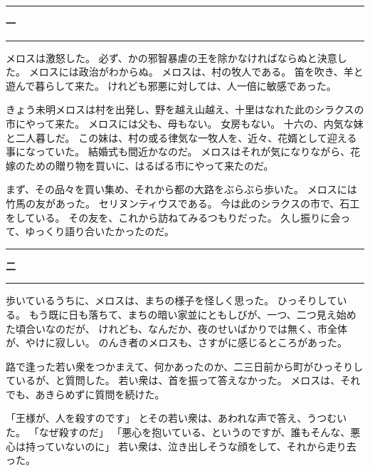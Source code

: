 \documentclass[
  paper       = a5,          %
  fontsize    = 10.5pt,      %
  jafontsize  = 10.5pt,
  baselineskip= 20pt,        %
  line_length = 38zw,        %
  number_of_lines = 17,      %
  head_space  = 20mm,        %
  foot_space  = 18mm,        %
  tate,                      %
  lualatex,
]{jlreq}
\newcommand{\章見出し}[1]{%
  \vspace{4\zw}%
  \noindent
  \textcolor{shuiro}{\rule[-0.15\zh]{0.55pt}{1.35\zh}}%
  \hspace{0.6\zw}%
  {\large\bfseries\color{sumi} #1}%
  \hspace{0.6\zw}%
  \textcolor{shuiro}{\rule[-0.15\zh]{0.55pt}{1.35\zh}}%
  \vspace{2\zw}\par
}
\begin{document}
\章見出し{一}

メロスは激怒した。
必ず、かの邪智暴虐の王を除かなければならぬと決意した。
メロスには政治がわからぬ。
メロスは、村の牧人である。
笛を吹き、羊と遊んで暮らして来た。
けれども邪悪に対しては、人一倍に敏感であった。

きょう未明メロスは村を出発し、野を越え山越え、十里はなれた此のシラクスの市にやって来た。
メロスには父も、母もない。
女房もない。
十六の、内気な妹と二人暮しだ。
この妹は、村の或る律気な一牧人を、近々、花婿として迎える事になっていた。
結婚式も間近かなのだ。
メロスはそれが気になりながら、花嫁のための贈り物を買いに、はるばる市にやって来たのだ。

まず、その品々を買い集め、それから都の大路をぶらぶら歩いた。
メロスには竹馬の友があった。
セリヌンティウスである。
今は此のシラクスの市で、石工をしている。
その友を、これから訪ねてみるつもりだった。
久し振りに会って、ゆっくり語り合いたかったのだ。

\章見出し{二}

歩いているうちに、メロスは、まちの様子を怪しく思った。
ひっそりしている。
もう既に日も落ちて、まちの暗い家並にともしびが、一つ、二つ見え始めた頃合いなのだが、
けれども、なんだか、夜のせいばかりでは無く、市全体が、やけに寂しい。
のんき者のメロスも、さすがに感じるところがあった。

路で逢った若い衆をつかまえて、何かあったのか、二三日前から町がひっそりしているが、と質問した。
若い衆は、首を振って答えなかった。
メロスは、それでも、あきらめずに質問を続けた。

「王様が、人を殺すのです」
とその若い衆は、あわれな声で答え、うつむいた。
「なぜ殺すのだ」
「悪心を抱いている、というのですが、誰もそんな、悪心は持っていないのに」
若い衆は、泣き出しそうな顔をして、それから走り去った。
\end{document}
